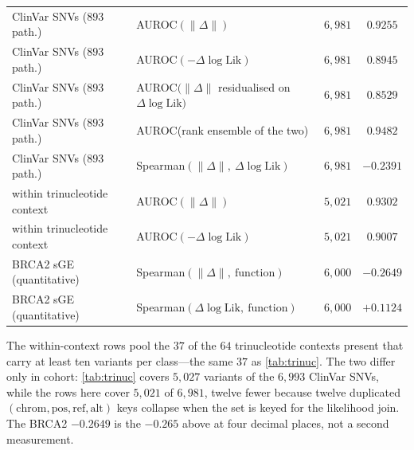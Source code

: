 {\begin{table}[t]
\begin{tabular}{llcc}
    ClinVar SNVs ($893$ path.)   & AUROC$(\lVert\Delta\rVert)$                          & $6{,}981$ & $0.9255$ \\
    ClinVar SNVs ($893$ path.)   & AUROC$(-\Delta\log\mathrm{Lik})$                     & $6{,}981$ & $0.8945$ \\
    ClinVar SNVs ($893$ path.)   & AUROC$(\lVert\Delta\rVert$ residualised on $\Delta\log\mathrm{Lik})$ & $6{,}981$ & $0.8529$ \\
    ClinVar SNVs ($893$ path.)   & AUROC(rank ensemble of the two)                      & $6{,}981$ & $\mathbf{0.9482}$ \\
    ClinVar SNVs ($893$ path.)   & Spearman$(\lVert\Delta\rVert,\ \Delta\log\mathrm{Lik})$ & $6{,}981$ & $-0.2391$ \\
    \quad within trinucleotide context & AUROC$(\lVert\Delta\rVert)$                    & $5{,}021$ & $0.9302$ \\
    \quad within trinucleotide context & AUROC$(-\Delta\log\mathrm{Lik})$               & $5{,}021$ & $0.9007$ \\
    BRCA2 sGE (quantitative)     & Spearman$(\lVert\Delta\rVert,\ \text{function})$      & $6{,}000$ & $-0.2649$ \\
    BRCA2 sGE (quantitative)     & Spearman$(\Delta\log\mathrm{Lik},\ \text{function})$  & $6{,}000$ & $+0.1124$ \\
    \bottomrule
  \end{tabular}
  \vspace{2pt}

  {\footnotesize The within-context rows pool the $37$ of the $64$ trinucleotide contexts present
  that carry at least ten variants per class---the same $37$ as \cref{tab:trinuc}. The two differ
  only in cohort: \cref{tab:trinuc} covers $5{,}027$ variants of the $6{,}993$ ClinVar SNVs, while
  the rows here cover $5{,}021$ of $6{,}981$, twelve fewer because twelve duplicated
  $(\text{chrom},\text{pos},\text{ref},\text{alt})$ keys collapse when the set is keyed for the
  likelihood join. The BRCA2 $-0.2649$ is the $-0.265$ above at four decimal places, not a second
  measurement.}
\end{table}}

